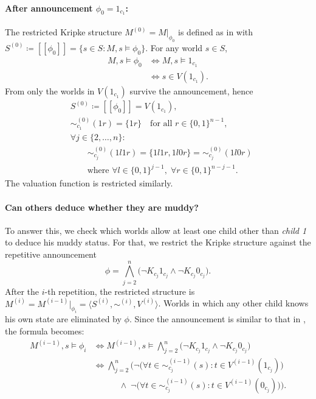 \paragraph*{After announcement $\phi_0 = 1_{c_1}$:}
The restricted Kripke structure $M^{(0)} = M|_{\phi_0}$ is defined as in 
 with $S^{(0)} \coloneqq [\![ \phi_0 ]\!] = 
\{ s \in S : M,s \models \phi_0 \}$. 
For any world $s \in S$,
\begin{align*}
    M,s \models \phi_0 
        &\iff M,s \models 1_{c_1} \\
        &\iff s \in V(1_{c_1}). \tag{1.2(d1)}\label{eq:1.2(d1)}
\end{align*}
From  only the worlds in $V(1_{c_1})$ survive the announcement, hence
\begin{align*}
    &S^{(0)} \coloneqq [\![ \phi_0 ]\!] = V(1_{c_1}), \\
    &\sim_{c_1}^{(0)}(1r) = \{1r\} \quad \text{for all } r \in \{0,1\}^{n-1}, \\
    &\forall j \in \{2,\dots,n\}: \\
    &\qquad \sim_{c_j}^{(0)}(1l1r) = \{ 1l1r, 1l0r \} = \sim_{c_j}^{(0)}(1l0r) \\
    &\qquad \text{where } \forall l \in \{0,1\}^{j-1},\; 
        \forall r \in \{0,1\}^{n-j-1}. \tag{1.2(d2)}\label{eq:1.2(d2)}
\end{align*}
The valuation function is restricted similarly.

\paragraph*{Can others deduce whether they are muddy?}
To answer this, we check which worlds allow at least one child other than 
\emph{child 1} to deduce his muddy status. For that, we restrict the Kripke structure 
against the repetitive announcement 
\[
\phi = \bigwedge_{j=2}^{n} \big( \neg K_{c_j}1_{c_j} \land \neg K_{c_j}0_{c_j} \big).
\]
After the $i$-th repetition, the restricted structure is 
$M^{(i)} = M^{(i-1)}|_{\phi_i} = \langle S^{(i)}, \sim^{(i)}, V^{(i)} \rangle$. 
Worlds in which any other child knows his own state are eliminated by $\phi$. 
Since the announcement is similar to that in , the formula becomes:
\begin{align*}
    M^{(i-1)},s \models \phi_i 
        &\iff M^{(i-1)},s \models \bigwedge_{j=2}^{n} 
            \big( \neg K_{c_j}1_{c_j} \land \neg K_{c_j}0_{c_j} \big) \\
        &\iff \bigwedge_{j=2}^{n} \Big( 
            \neg\bigl(\forall t \in \sim_{c_j}^{(i-1)}(s): 
                t \in V^{(i-1)}(1_{c_j})\bigr) \\
        &\qquad\quad \land\; 
            \neg\bigl(\forall t \in \sim_{c_j}^{(i-1)}(s): 
                t \in V^{(i-1)}(0_{c_j})\bigr) \Big). 
                \tag{1.2(d3)}\label{eq:1.2(d3)}
\end{align*}

